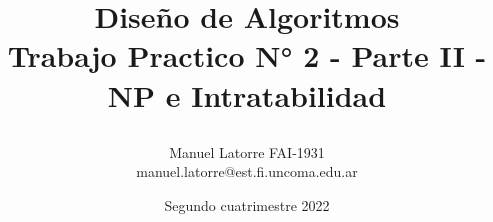 \titlepage

\title{\textbf{Diseño de Algoritmos}\\
\large{\textbf{Trabajo Practico N° 2 - Parte II - NP e Intratabilidad}}
\author{
Manuel Latorre FAI-1931\\ manuel.latorre@est.fi.uncoma.edu.ar\vspace{3mm}\\
}}
\date{Segundo cuatrimestre 2022}

\maketitle
\vspace{25mm}
\vfill
{}

\thispagestyle{empty}
\titlepage
\newpage
\tableofcontents %
\newpage
\pagestyle{plain}
\thispagestyle{plain}
\pagebreak